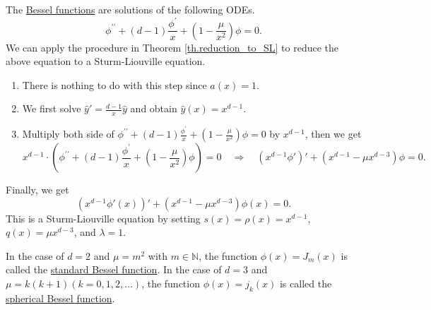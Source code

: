 \begin{example} The \underline{Bessel functions} are solutions of the following ODEs.
\begin{equation}\label{eq.Bessel}
    \phi^{\prime \prime}+(d-1) \frac{\phi^{\prime}}{x}+\left(1-\frac{\mu}{x^2}\right) \phi=0.
\end{equation}
We can apply the procedure in Theorem \ref{th.reduction_to_SL} to reduce the above equation to a Sturm-Liouville equation.

\begin{enumerate}
    \item There is nothing to do with this step since $a(x) = 1$.
    \item We first solve $\widehat{y}' = \frac{d-1}{x}\widehat{y}$ and obtain $\widehat{y}(x) = x^{d-1}$.
    \item Multiply both side of $\phi^{\prime \prime}+(d-1) \frac{\phi^{\prime}}{x}+\left(1-\frac{\mu}{x^2}\right) \phi=0$ by $x^{d-1}$, then we get 
    \begin{equation}
        x^{d-1}\cdot\left(\phi^{\prime \prime}+(d-1) \frac{\phi^{\prime}}{x}+\left(1-\frac{\mu}{x^2}\right) \phi\right)=0 \quad \Rightarrow\quad (x^{d-1}\phi')'+\left(x^{d-1}-\mu x^{d-3}\right) \phi=0.
    \end{equation}
\end{enumerate}
Finally, we get
\begin{equation}\label{eq.Bessel_SL}
    (x^{d-1}\phi'(x))'+\left(x^{d-1}-\mu x^{d-3}\right) \phi(x)=0.
\end{equation}
This is a Sturm-Liouville equation by setting $s(x)=\rho(x)=x^{d-1}$, $q(x)=\mu x^{d-3}$, and $\lambda=1$.

In the case of $d=2$ and $\mu=m^2$ with $m\in \mathbb{N}$, the function $\phi(x)=J_m(x)$ is called the \underline{standard Bessel function}. In the case of $d=3$ and $\mu=k(k+1)(k=0,1,2, \ldots)$, the function $\phi(x)=j_k(x)$ is called the \underline{spherical Bessel function}.
\end{example}

